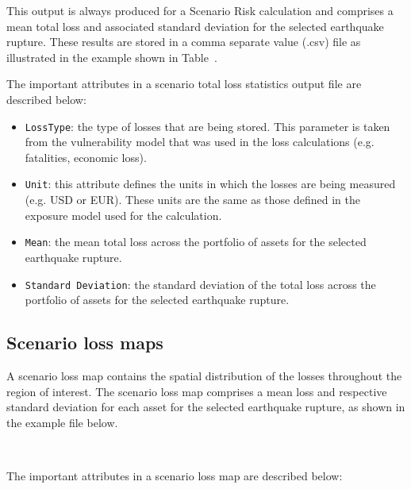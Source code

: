 This output is always produced for a Scenario Risk calculation and comprises a
mean total loss and associated standard deviation for the selected earthquake
rupture. These results are stored in a comma separate value (.csv) file as
illustrated in the example shown in Table~\label{output:scenario_loss_total}.



The important attributes in a scenario total loss statistics output file are
described below:


\begin{itemize}

  \item \Verb+LossType+: the type of losses that are being stored. This
    parameter is taken from the \gls{vulnerability model} that was used in the
    loss calculations (e.g. fatalities, economic loss).

  \item \Verb+Unit+: this attribute defines the units in which the losses are
    being measured (e.g. USD or EUR). These units are the same as those defined
    in the \gls{exposure model} used for the calculation.

  \item \Verb+Mean+: the mean total loss across the portfolio of assets for the
    selected earthquake rupture.

  \item \Verb+Standard Deviation+: the standard deviation of the total loss 
    across the portfolio of assets for the selected earthquake rupture.

\end{itemize}


\subsection{Scenario loss maps}
\label{subsec:scenario_loss_map}

A scenario loss map contains the spatial distribution of the losses throughout
the region of interest. The scenario loss map comprises a mean loss and
respective standard deviation for each \gls{asset} for the selected earthquake
rupture, as shown in the example file below.

\inputminted[firstline=1,firstnumber=1,fontsize=\footnotesize,frame=single,bgcolor=lightgray]{xml}{oqum/risk/verbatim/output_scenario_loss_map.xml}\\

The important attributes in a scenario loss map are described below:

